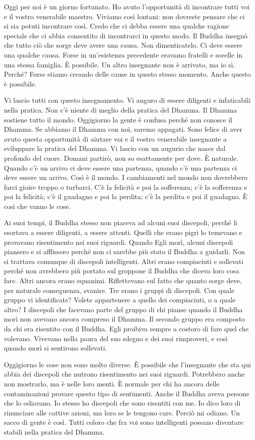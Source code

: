 Oggi per noi è un giorno fortunato. Ho avuto l'opportunità di incontrare
tutti voi e il vostro venerabile maestro. Viviamo così lontani: non
dovreste pensare che ci si sia potuti incontrare così. Credo che ci
debba essere una qualche ragione speciale che ci abbia consentito di
incontrarci in questo modo. Il Buddha insegnò che tutto ciò che sorge
deve avere una causa. Non dimenticatelo. Ci deve essere una qualche
causa. Forse in un'esistenza precedente eravamo fratelli e sorelle in
una stessa famiglia. È possibile. Un altro insegnante non è arrivato, ma
io sì. Perché? Forse stiamo creando delle cause in questo stesso
momento. Anche questo è possibile.

Vi lascio tutti con questo insegnamento. Vi auguro di essere diligenti e
infaticabili nella pratica. Non c'è niente di meglio della pratica del
Dhamma. Il Dhamma sostiene tutto il mondo. Oggigiorno la gente è confusa
perché non conosce il Dhamma. Se abbiamo il Dhamma con noi, saremo
appagati. Sono felice di aver avuto questa opportunità di aiutare voi e
il vostro venerabile insegnante a sviluppare la pratica del Dhamma. Vi
lascio con un augurio che nasce dal profondo del cuore. Domani partirò,
non so esattamente per dove. È naturale. Quando c'è un arrivo ci deve
essere una partenza, quando c'è una partenza ci deve essere un arrivo.
Così è il mondo. I cambiamenti nel mondo non dovrebbero farci gioire
troppo o turbarci. C'è la felicità e poi la sofferenza; c'è la
sofferenza e poi la felicità; c'è il guadagno e poi la perdita; c'è la
perdita e poi il guadagno. È così che vanno le cose.

Ai suoi tempi, il Buddha stesso non piaceva ad alcuni suoi discepoli,
perché li esortava a essere diligenti, a essere attenti. Quelli che
erano pigri lo temevano e provavano risentimento nei suoi riguardi.
Quando Egli morì, alcuni discepoli piansero e si afflissero perché non
ci sarebbe più stato il Buddha a guidarli. Non si trattava comunque di
discepoli intelligenti. Altri erano compiaciuti e sollevati perché non
avrebbero più portato sul groppone il Buddha che diceva loro cosa fare.
Altri ancora erano equanimi. Riflettevano sul fatto che quanto sorge
deve, per naturale conseguenza, svanire. Tre erano i gruppi di
discepoli. Con quale gruppo vi identificate? Volete appartenere a quello
dei compiaciuti, o a quale altro? I discepoli che facevano parte del
gruppo di chi pianse quando il Buddha morì non avevano ancora compreso
il Dhamma. Il secondo gruppo era composto da chi era risentito con il
Buddha. Egli proibiva sempre a costoro di fare quel che volevano.
Vivevano nella paura del suo sdegno e dei suoi rimproveri, e così quando
morì si sentirono sollevati.

Oggigiorno le cose non sono molto diverse. È possibile che l'insegnante
che sta qui abbia dei discepoli che nutrono risentimento nei suoi
riguardi. Potrebbero anche non mostrarlo, ma è nelle loro menti. È
normale per chi ha ancora delle contaminazioni provare questo tipo di
sentimenti. Anche il Buddha aveva persone che lo odiavano. Io stesso ho
discepoli che sono risentiti con me. Io dico loro di rinunciare alle
cattive azioni, ma loro se le tengono care. Perciò mi odiano. Un sacco
di gente è così. Tutti coloro che fra voi sono intelligenti possano
diventare stabili nella pratica del Dhamma.

